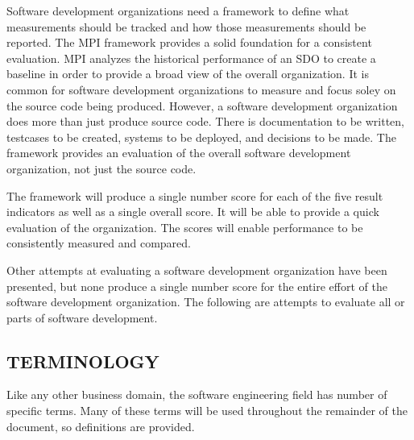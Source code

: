 \documentclass[SDSUThesis.tex]{subfiles}
\begin{document}
    Software development organizations need a framework to define
    what measurements should be tracked and how those measurements
    should be reported.  The MPI framework provides a solid foundation
    for a consistent evaluation.  MPI analyzes the historical performance
    of an SDO
    to create a baseline in order to provide a broad
    view of the overall organization.  It is common for software development
    organizations to measure and focus soley on the source code
    being produced.  However, a software development organization does more
    than just produce source code.  There is documentation to be
    written, testcases to be created, systems to be deployed, and
    decisions to be made.  The framework provides an evaluation
    of the overall software development organization, not just the
    source code.
    
    The framework will produce a single number score for each of 
    the five result indicators as well as a single overall score.  
    It will be able to provide a quick evaluation of the organization.
    The scores will enable performance to be consistently measured
    and compared.

    Other attempts at evaluating a software development organization
    have been presented, but none produce a single number score for
    the entire effort of the software development organization. 
    The following are attempts to evaluate all or parts of 
    software development.


\subsection{TERMINOLOGY}
    Like any other business domain, the software engineering field has number
    of specific terms.  Many of these terms will be used throughout the remainder
    of the document, so definitions are provided.  
\end{document}
